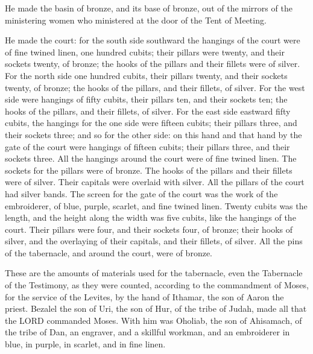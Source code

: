 \myverse{}He made the basin of bronze, and its base of bronze, out of the
mirrors of the ministering women who ministered at the door of the Tent of Meeting.


\myverse{}He made the court: for the south side southward the hangings of
the court were of fine twined linen, one hundred cubits;
\myverse{}their pillars were twenty, and their sockets twenty, of bronze; the hooks
of the pillars and their fillets were of silver.
\myverse{}For the north side one hundred cubits, their pillars twenty, and their sockets
twenty, of bronze; the hooks of the pillars, and their fillets, of silver.
\myverse{}For the west side were hangings of fifty cubits, their pillars ten, and their
sockets ten; the hooks of the pillars, and their fillets, of silver.
\myverse{}For the east side eastward fifty cubits,
\myverse{}the hangings for the one side were fifteen cubits; their pillars three, and
their sockets three;
\myverse{}and so for the other side: on this hand and that hand by the gate of the
court were hangings of fifteen cubits; their pillars three, and their sockets three.
\myverse{}All the hangings around the court were of fine twined linen.
\myverse{}The sockets for the pillars were of bronze. The hooks of the pillars and
their fillets were of silver. Their capitals were overlaid with silver. All the pillars of the court had
silver bands.
\myverse{}The screen for the gate of the court was the work of the embroiderer, of
blue, purple, scarlet, and fine twined linen. Twenty cubits was the length, and the height along the width
was five cubits, like the hangings of the court.
\myverse{}Their pillars were four, and their sockets four, of bronze; their hooks of
silver, and the overlaying of their capitals, and their fillets, of silver.
\myverse{}All the pins of the tabernacle, and around the court, were of bronze.


\myverse{}These are the amounts of materials used for the tabernacle,
even the Tabernacle of the Testimony, as they were counted, according to the commandment of Moses, for
the service of the Levites, by the hand of Ithamar, the son of Aaron the priest.
\myverse{}Bezalel the son of Uri, the son of Hur, of the tribe of Judah, made all that
the LORD commanded Moses.
\myverse{}With him was Oholiab, the son of Ahisamach, of the tribe of Dan, an engraver,
and a skillful workman, and an embroiderer in blue, in purple, in scarlet, and in fine linen.


